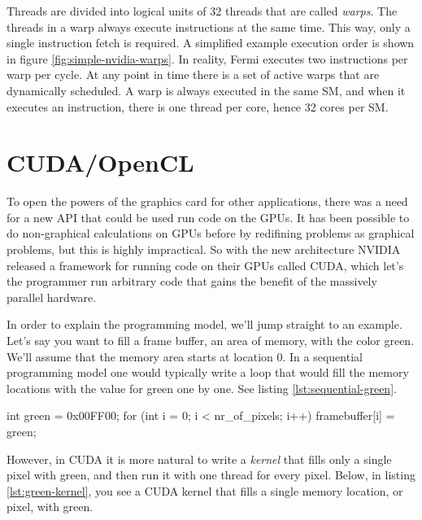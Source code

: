 \documentclass[../main/report.tex]{subfiles}
\begin{document}
Threads are divided into logical units of 32 threads that are called \emph{warps}. 
The threads in a warp always execute instructions at the same time.
This way, only a single instruction fetch is required.
A simplified example execution order is shown in figure \ref{fig:simple-nvidia-warps}.
In reality, Fermi executes two instructions per warp per cycle. 
At any point in time there is a set of active warps that are dynamically scheduled. 
A warp is always executed in the same SM, and when it executes an instruction, there is one thread per core, hence 32 cores per SM.




\section{CUDA/OpenCL}

To open the powers of the graphics card for other applications, there was a need for a new API that could be
used run code on the GPUs. It has been possible to do non-graphical calculations on GPUs before by 
redifining problems as graphical problems, but this is highly impractical. 
So with the new architecture NVIDIA released a framework for running code on their GPUs called CUDA, 
which let's the programmer run arbitrary code that gains the benefit of the massively parallel hardware.

In order to explain the programming model, we'll jump straight to an example.
Let's say you want to fill a frame buffer, an area of memory, with the color green.
We'll assume that the memory area starts at location 0.
In a sequential programming model one would typically write a loop that would fill
the memory locations with the value for green one by one.
See listing \ref{lst:sequential-green}.

\begin{c-code}[caption=A sequential program filling the screen with green, label=lst:sequential-green]
int green = 0x00FF00;
for (int i = 0; i < nr_of_pixels; i++){
	framebuffer[i] = green;
}
\end{c-code}

However, in CUDA it is more natural to write a \emph{kernel} that fills only a single pixel with green, 
and then run it with one thread for every pixel.
Below, in listing \ref{lst:green-kernel},
you see a CUDA kernel that fills a single memory location, or pixel, with green.
\end{document}
